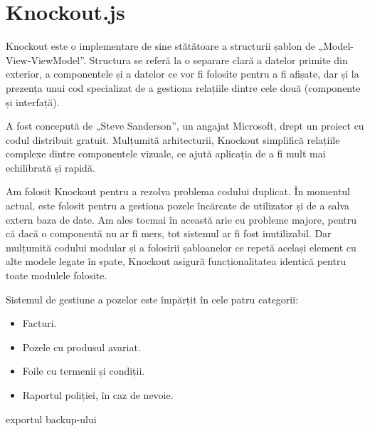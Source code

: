 \section{Knockout.js}

	Knockout este o implementare de sine stătătoare a structurii șablon de „Model-View-ViewModel”.
	Structura se referă la o separare clară a datelor primite din exterior, a componentele și a datelor ce vor fi folosite pentru a fi afișate, dar și la prezența unui cod specializat de a gestiona relațiile dintre cele două (componente și interfață). \cite{knockout_js}

	A fost concepută de „Steve Sanderson”, un angajat Microsoft, drept un proiect cu codul distribuit gratuit. \cite{knockout_js_site}
	Mulțumită arhitecturii, Knockout simplifică relațiile complexe dintre componentele vizuale, ce ajută aplicația de a fi mult mai echilibrată și rapidă.

	Am folosit Knockout pentru a rezolva problema codului duplicat.
	În momentul actual, este folosit pentru a gestiona pozele încărcate de utilizator și de a salva extern baza de date.
	Am ales tocmai în această arie cu probleme majore, pentru că dacă o componentă nu ar fi mers, tot sistemul ar fi fost inutilizabil.
	Dar mulțumită codului modular și a folosirii șabloanelor ce repetă același element cu alte modele legate în spate, Knockout asigură funcționalitatea identică pentru toate modulele folosite.

	Sistemul de gestiune a pozelor este împărțit în cele patru categorii:
	\begin{itemize}
		\item Facturi.
		\item Pozele cu produsul avariat.
		\item Foile cu termenii și condiții.
		\item Raportul poliției, în caz de nevoie.
	\end{itemize}

		exportul backup-ului
